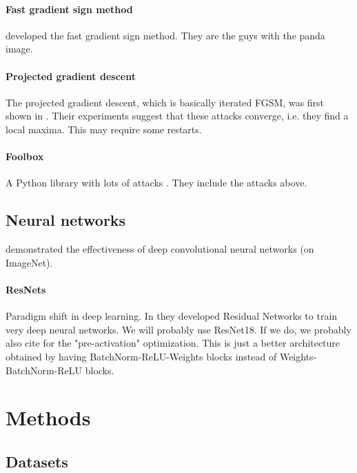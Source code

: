 \documentclass{article}
\begin{document}
\paragraph{Fast gradient sign method}
\cite{goodfellow2014explaining} developed the fast gradient sign method. They are the guys with the panda image.

\paragraph{Projected gradient descent}
The projected gradient descent, which is basically iterated FGSM, was first shown in \cite{madry2017towards}. Their experiments suggest that these attacks converge, i.e. they find a local maxima. This may require some restarts.

\paragraph{Foolbox}
A Python library with lots of attacks \cite{rauber2017foolbox}. They include the attacks above.

\subsection{Neural networks}

\cite{krizhevsky2012imagenet} demonstrated the effectiveness of deep convolutional neural networks (on ImageNet).

\paragraph{ResNets}
Paradigm shift in deep learning. In \cite{he2016deep} they developed Residual Networks to train very deep neural networks. We will probably use ResNet18. If we do, we probably also cite \cite{he2016identity} for the "pre-activation" optimization. This is just a better architecture obtained by having BatchNorm-ReLU-Weights blocks instead of Weights-BatchNorm-ReLU blocks.


\section{Methods}
\subsection{Datasets}

\subsection{}



\end{document}

